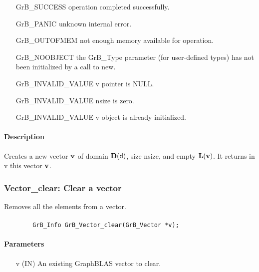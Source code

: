 \begin{itemize}[leftmargin=2.1in]
\item[{\sf GrB\_SUCCESS}]    operation completed successfully.
\item[{\sf GrB\_PANIC}]      unknown internal error.
\item[{\sf GrB\_OUTOFMEM}]   not enough memory available for operation.
\item[{\sf GrB\_NOOBJECT}]   the {\sf GrB\_Type} parameter (for user-defined
                             types) has not been initialized by a
                             call to {\sf new}.
\item[{\sf GrB\_INVALID\_VALUE}]    {\sf v} pointer is {\sf NULL}.
\item[{\sf GrB\_INVALID\_VALUE}]    {\sf nsize} is zero.
\item[{\sf GrB\_INVALID\_VALUE}]    {\sf v} object is already initialized.
\end{itemize}

\paragraph{Description}

Creates a new vector ${\bf v}$ of domain $\bold{D}({\sf d})$, size {\sf nsize}, 
and empty $\bold{L}({\bf v})$. It returns in {\sf v} this vector ${\bf v}$.

\subsubsection{{\sf Vector\_clear}: Clear a vector}

Removes all the elements from a vector.

\paragraph{\syntax}

\begin{verbatim}
        GrB_Info GrB_Vector_clear(GrB_Vector *v);
\end{verbatim}

\paragraph{Parameters}

\begin{itemize}[leftmargin=1.1in]
    \item[{\sf v}] ({\sf IN}) An existing GraphBLAS vector to clear.
\end{itemize}

